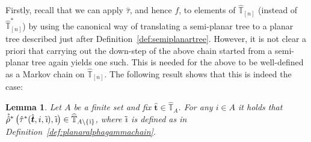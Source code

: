 \documentclass[a4paper, final]{amsart}
\theoremstyle{plain}
\newtheorem{lemma}[thm]{Lemma}
\theoremstyle{definition}
\newcommand{\that}[1][t]{\hat{\boldsymbol{#1}}} %
\newcommand{\Thatspace}[1][\T]{\widehat{\boldsymbol{#1}}} %
\newcommand{\T}{\mathbb{T}}
\DeclareMathOperator{\tildei}{\tilde{\textit{\i}}}
\begin{document}
%
Firstly, recall that we can apply $\hat{\tau}$, and hence $f$, to elements of $\Thatspace_{[n]}$ (instead of $\Thatspace_{[n]}^*$) by using the canonical way of translating a semi-planar tree to a planar tree described just after Definition~\ref{def:semiplanartree}. 
However, it is not clear a priori that carrying out the down-step of the above chain started from a semi-planar tree again yields one such.
This is needed for the above to be well-defined as a Markov chain on $\Thatspace_{[n]}$.
The following result shows that this is indeed the case:
%
\begin{lemma}
  Let $A$ be a finite set and fix $\that \in \Thatspace_A$.
For any $i \in A$ it holds that $\mathring{\hat{\rho}}^* \left( \hat{\tau}^* (\that, i, \tildei), \tildei \right) \in \Thatspace_{A \setminus \{\tildei\}}$, where $\tildei$ is defined as in Definition~\ref{def:planaralphagammachain}.
  \label{lemma:downstepsemiplanaroutput}
\end{lemma}
%
\end{document}
